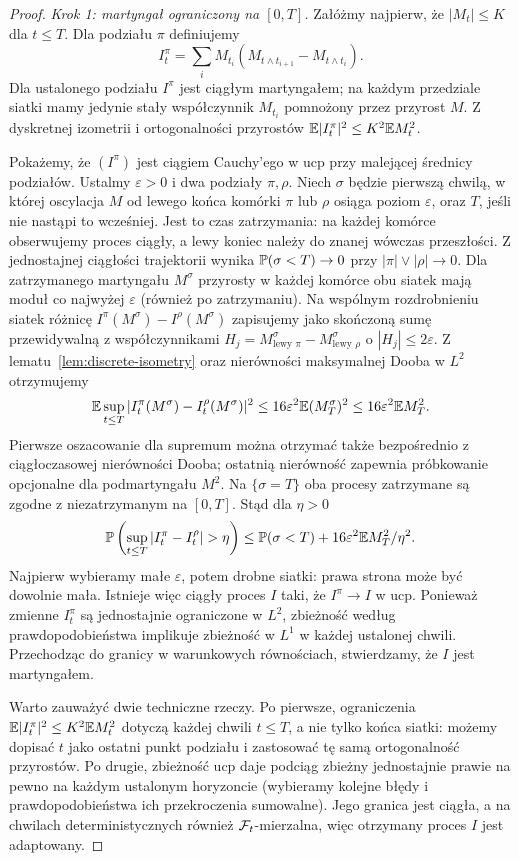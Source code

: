 \begin{proof}
\emph{Krok 1: martyngał ograniczony na $[0,T]$.}
Załóżmy najpierw, że $|M_t|\le K$ dla $t\le T$.
Dla podziału $\pi$ definiujemy
\[
I_t^\pi=\sum_i M_{t_i}
(M_{t\wedge t_{i+1}}-M_{t\wedge t_i}).
\]
Dla ustalonego podziału $I^\pi$ jest ciągłym martyngałem;
na każdym przedziale siatki mamy jedynie stały
współczynnik $M_{t_i}$ pomnożony przez przyrost $M$.
Z dyskretnej izometrii i ortogonalności przyrostów
$\mathbb{E}|I_t^\pi|^2\le K^2\mathbb{E} M_t^2$.

Pokażemy, że $(I^\pi)$ jest ciągiem Cauchy'ego w
ucp przy malejącej średnicy podziałów. Ustalmy
$\varepsilon>0$ i dwa podziały $\pi,\rho$.
Niech $\sigma$ będzie pierwszą chwilą, w której
oscylacja $M$ od lewego końca komórki $\pi$ lub
$\rho$ osiąga poziom $\varepsilon$, oraz $T$,
jeśli nie nastąpi to wcześniej. Jest to czas zatrzymania:
na każdej komórce obserwujemy proces ciągły,
a lewy koniec należy do znanej wówczas przeszłości.
Z jednostajnej ciągłości trajektorii wynika
$\mathbb{P}(\sigma<T)\to0$ przy
$|\pi|\vee|\rho|\to0$.
Dla zatrzymanego martyngału $M^\sigma$ przyrosty
w każdej komórce obu siatek mają moduł co najwyżej
$\varepsilon$ (również po zatrzymaniu).
Na wspólnym rozdrobnieniu siatek różnicę
$I^\pi(M^\sigma)-I^\rho(M^\sigma)$ zapisujemy jako
skończoną sumę przewidywalną z współczynnikami
$H_j=M^\sigma_{\text{lewy }\pi}-
M^\sigma_{\text{lewy }\rho}$ o $|H_j|\le2\varepsilon$.
Z lematu~\ref{lem:discrete-isometry} oraz nierówności
maksymalnej Dooba w $L^2$ otrzymujemy
\[
\mathbb{E}\sup_{t\le T}|I_t^\pi(M^\sigma)-
I_t^\rho(M^\sigma)|^2
\le16\varepsilon^2\mathbb{E} (M^\sigma_T)^2
\le16\varepsilon^2\mathbb{E} M_T^2.
\]
Pierwsze oszacowanie dla supremum można otrzymać także
bezpośrednio z ciągłoczasowej nierówności Dooba;
ostatnią nierówność zapewnia próbkowanie opcjonalne
dla podmartyngału $M^2$.
Na $\{\sigma=T\}$ oba procesy zatrzymane są zgodne
z niezatrzymanym na $[0,T]$. Stąd dla $\eta>0$
\[
\Prob\left(\sup_{t\le T}|I_t^\pi-I_t^\rho|>\eta\right)
\le\Prob(\sigma<T)+16\varepsilon^2\E M_T^2/\eta^2.
\]
Najpierw wybieramy małe $\varepsilon$, potem drobne
siatki: prawa strona może być dowolnie mała.
Istnieje więc ciągły proces $I$ taki, że
$I^\pi\to I$ w ucp.
Ponieważ zmienne $I_t^\pi$ są jednostajnie ograniczone
w $L^2$, zbieżność według prawdopodobieństwa implikuje
zbieżność w $L^1$ w każdej ustalonej chwili.
Przechodząc do granicy w warunkowych równościach,
stwierdzamy, że $I$ jest martyngałem.


Warto zauważyć dwie techniczne rzeczy. Po pierwsze, ograniczenia
$\mathbb{E}|I_t^\pi|^2\le K^2\mathbb{E} M_t^2$ dotyczą każdej chwili $t\le T$,
a nie tylko końca siatki: możemy dopisać $t$ jako ostatni punkt
podziału i zastosować tę samą ortogonalność przyrostów.
Po drugie, zbieżność ucp daje podciąg zbieżny jednostajnie prawie
na pewno na każdym ustalonym horyzoncie (wybieramy kolejne błędy
i prawdopodobieństwa ich przekroczenia sumowalne). Jego granica
jest ciągła, a na chwilach deterministycznych również
$\mathcal{F}_t$-mierzalna, więc otrzymany proces $I$ jest adaptowany.



\end{proof}
